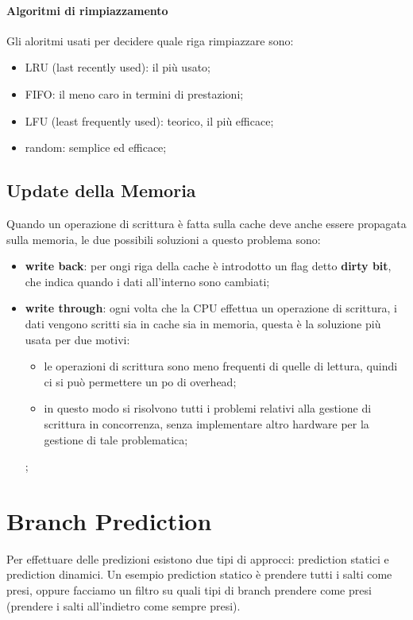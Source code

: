 \documentclass[12pt]{article}
\begin{document}
\paragraph{Algoritmi di rimpiazzamento}
Gli aloritmi usati per decidere quale riga rimpiazzare sono:
\begin{itemize}
    \item LRU (last recently used): il pi\`u usato;
    \item FIFO: il meno caro in termini di prestazioni;
    \item LFU (least frequently used): teorico, il pi\`u efficace;
    \item random: semplice ed efficace;
\end{itemize}

\subsection{Update della Memoria}
Quando un operazione di scrittura \`e fatta sulla cache deve anche essere propagata sulla memoria, le due possibili soluzioni a questo problema sono:
\begin{itemize}
    \item \textbf{write back}: per ongi riga della cache \`e introdotto un flag detto \textbf{dirty bit}, che indica quando i dati all'interno sono cambiati;
    \item \textbf{write through}: ogni volta che la CPU effettua un operazione di scrittura, i dati vengono scritti sia in cache sia in memoria, questa \`e la soluzione pi\`u usata per due motivi:
        \begin{itemize}
            \item le operazioni di scrittura sono meno frequenti di quelle di lettura, quindi ci si pu\`o permettere un po di overhead;
            \item in questo modo si risolvono tutti i problemi relativi alla gestione di scrittura in concorrenza, senza implementare altro hardware per la gestione di tale problematica;
        \end{itemize};
\end{itemize}


\newpage
\section{Branch Prediction}
Per effettuare delle predizioni esistono due tipi di approcci: prediction statici e prediction dinamici. Un esempio prediction statico \`e prendere tutti i salti come presi, oppure facciamo un filtro su quali tipi di branch prendere come presi (prendere i salti all'indietro come sempre presi).
\end{document}
